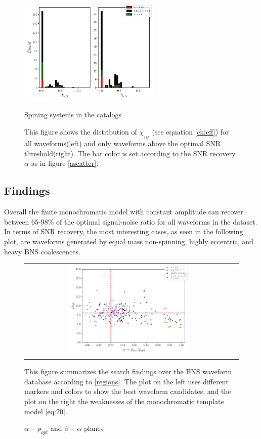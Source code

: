 \begin{figure}[hbt!]
\begin{center}
\includegraphics[width=0.6\textwidth, angle=0]{images/Data_analysis/results/alpha_chihist.pdf}
\captionsetup{width=0.8\textwidth}
\caption{Spining systems in the catalogs}
\caption*{This figure shows the distribution of $\chi_{_{eff}}$ (see equation \ref{chieff}) for all waveforms(left) and only waveforms above the optimal SNR threshold(right). The bar color is set according to the SNR recovery $\alpha$ as in figure \ref{ascatter}.}
\label{achihist}
\end{center}
\end{figure}

\FloatBarrier


\subsection*{Findings}
Overall the finite monochromatic model with constant amplitude can recover between 65-98\% of the optimal signal-noise ratio for all waveforms in the dataset. In terms of SNR recovery, the most interesting cases, as seen in the following plot, are waveforms generated by equal mass non-spinning, highly eccentric, and heavy BNS coalescences. 

\begin{figure}[hbt!]
\begin{center}
\begin{tabular}{cc}
\includegraphics[width=0.6\textwidth, angle=0]{images/Data_analysis/results/alpha_sum0.pdf}
\end{tabular}
\end{center}
\caption{$\alpha - \rho_{opt}$ and $\beta - \alpha$  planes}
This figure summarizes the search findings over the BNS waveform database according to \ref{regions}. The plot on the left uses different markers and colors to show the best waveform candidates, and the plot on the right the weaknesses of the monochromatic template model \ref{eq:20}.
\end{figure}
\FloatBarrier

